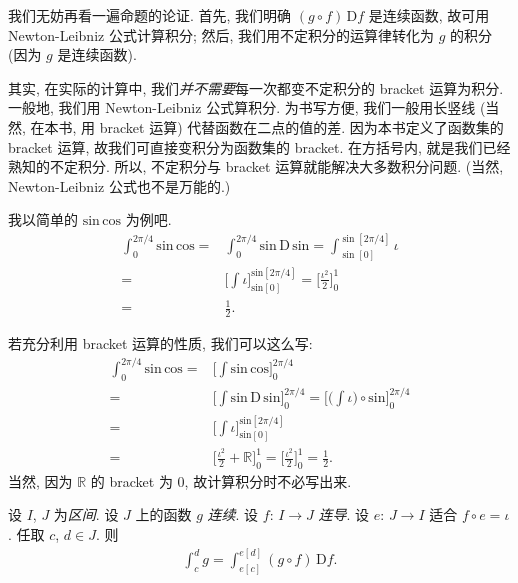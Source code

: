 我们无妨再看一遍命题的论证.
首先, 我们明确 $(g \circ f)\,\mathrm{D}f$ 是连续函数,
故可用 Newton-Leibniz 公式计算积分;
然后, 我们用不定积分的运算律转化为 $g$ 的积分
(因为 $g$ 是连续函数).

其实, 在实际的计算中,
我们\emph{并不需要}每一次都变不定积分的 bracket 运算为积分.
一般地, 我们用 Newton-Leibniz 公式算积分.
为书写方便, 我们一般用长竖线
(当然, 在本书, 用 bracket 运算)
代替函数在二点的值的差.
因为本书定义了函数集的 bracket 运算,
故我们可直接变积分为函数集的 bracket.
在方括号内, 就是我们已经熟知的不定积分.
所以, 不定积分与 bracket 运算就能解决大多数积分问题.
(当然, Newton-Leibniz 公式也不是万能的.)

\begin{example}
    我以简单的 $\mathrm{sin}\, \mathrm{cos}$ 为例吧.
    \begin{align*}
        \int_{0}^{2\pi/4} {\mathrm{sin}\,\mathrm{cos}}
        = {} & \int_{0}^{2\pi/4} {\mathrm{sin}\,\mathrm{D}\,\mathrm{sin}}
        = \int_{\sin[0]}^{\sin[2\pi/4]} {\iota}                                    \\
        = {} & \Bigg[ \int {\iota} \Bigg]_{\mathrm{sin}[0]}^{\mathrm{sin}[2\pi/4]}
        = \Bigg[ \frac{\iota^2}{2} \Bigg]_{0}^{1}                                  \\
        = {} & \frac{1}{2}.
    \end{align*}

    若充分利用 bracket 运算的性质, 我们可以这么写:
    \begin{align*}
        \int_{0}^{2\pi/4} {\mathrm{sin}\,\mathrm{cos}}
        = {} & \Bigg[ \int {\mathrm{sin}\,\mathrm{cos}} \Bigg]_{0}^{2\pi/4}             \\
        = {} & \Bigg[ \int {\mathrm{sin}\,\mathrm{D}\,\mathrm{sin}} \Bigg]_{0}^{2\pi/4}
        = \Bigg[ \Bigg( \int {\iota} \Bigg) \circ \mathrm{sin} \Bigg]_{0}^{2\pi/4}      \\
        = {} & \Bigg[ \int {\iota} \Bigg]_{\mathrm{sin}[0]}^{\mathrm{sin}[2\pi/4]}      \\
        = {} & \Bigg[ \frac{\iota^2}{2} + \mathbb{R} \Bigg]_{0}^{1}
        = \Bigg[ \frac{\iota^2}{2} \Bigg]_{0}^{1}
        = \frac{1}{2}.
    \end{align*}
    当然, 因为 $\mathbb{R}$ 的 bracket 为 $0$,
    故计算积分时不必写出来.
\end{example}

\begin{theorem}
    设 $I$, $J$ 为\emph{区间}.
    设 $J$ 上的函数 $g$ \emph{连续}.
    设 $f$: $I \to J$ \emph{连导}.
    设 $e$: $J \to I$ 适合 $f \circ e = \iota$.
    任取 $c$, $d \in J$.
    则
    \begin{align*}
        \int_{c}^{d} {g} = \int_{e[c]}^{e[d]} {(g \circ f)\,\mathrm{D}f}.
    \end{align*}
\end{theorem}

